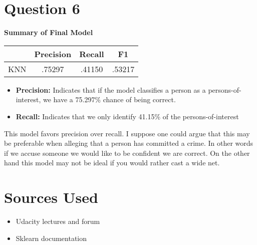 \documentclass[a4paper,11pt]{report}
\begin{document}
\section{Question 6}

\textbf{Summary of Final Model}
\begin{center}
    \begin{tabular}{|| l c c c ||}
        \hline & Precision & Recall & F1 \\
        \hline\hline
        KNN & .75297 & .41150 & .53217  \\
        \hline
    \end{tabular}
\end{center}

\begin{itemize}
    \item \textbf{Precision:} Indicates that if the model classifies a person as
        a persons-of-interest, we have a 75.297\% chance of being correct.
    \item \textbf{Recall:} Indicates that we only identify 41.15\% of the
        persons-of-interest
\end{itemize}

This model favors precision over recall.  I suppose one could argue that this
may be preferable when alleging that a person has committed a crime.  In other
words if we accuse someone we would like to be confident we are correct.  On the
other hand this model may not be ideal if you would rather cast a wide net.

\section{Sources Used}
  \begin{itemize}
    \item Udacity lectures and forum
    \item Sklearn documentation
  \end{itemize}
\end{document}
